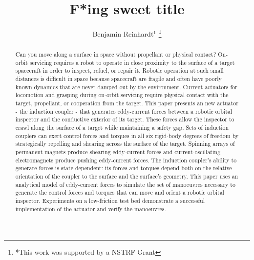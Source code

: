 \documentclass[letterpaper, 10 pt, conference]{ieeeconf}  %
\title{\LARGE \bf
F*ing sweet title
}
\author{Benjamin Reinhardt$^{1}$ %
\thanks{*This work was supported by a NSTRF Grant}%
}
\begin{document}
\maketitle
\thispagestyle{empty}
\pagestyle{empty}


\begin{abstract}

Can you move along a surface in space without propellant or physical contact? On-orbit servicing requires a robot to operate in close proximity to the surface of a target spacecraft in order to inspect, refuel, or repair it.  Robotic operation at such small distances is difficult in space because spacecraft are fragile and often have poorly known dynamics that are never damped out by the environment. Current actuators for locomotion and grasping during on-orbit servicing require physical contact with the target, propellant, or cooperation from the target.  
%
This paper presents an new actuator - the induction coupler - that generates eddy-current forces between a robotic orbital inspector and the conductive exterior of its target. These forces allow the inspector to crawl along the surface of a target while maintaining a safety gap. Sets of induction couplers can exert control forces and torques in all six rigid-body degrees of freedom by strategically repelling and shearing across the surface of the target. Spinning arrays of permanent magnets produce shearing eddy-current forces and current-oscillating electromagnets produce pushing eddy-current forces. 
%
The induction coupler's ability to generate forces is state dependent: its forces and torques depend both on the relative orientation of the coupler to the surface and the surface's geometry. This paper uses an analytical model of eddy-current forces to simulate the set of manoeuvres necessary to generate the control forces and torques that can move and orient a robotic orbital inspector. Experiments on a low-friction test bed demonstrate a successful implementation of the actuator and verify the manoeuvres.

\end{abstract}


\listoftodos
{}
\end{document}
